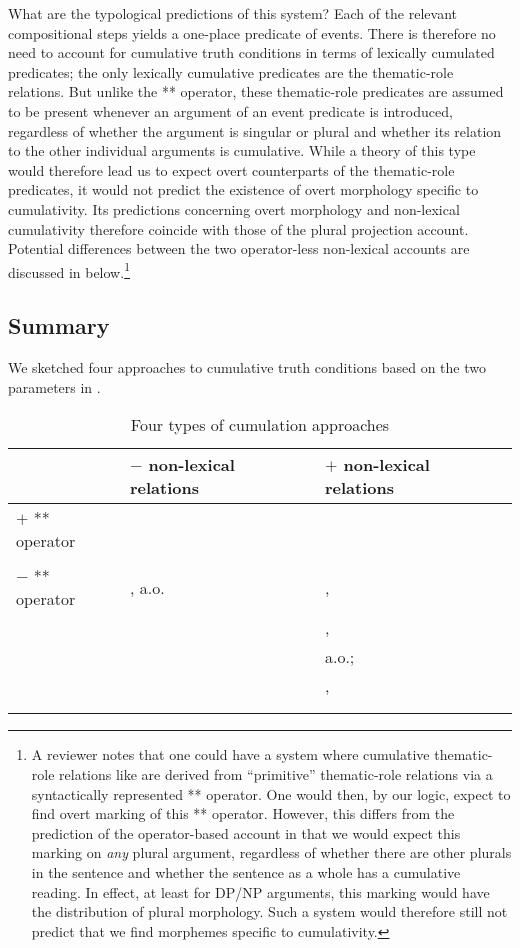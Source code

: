 \documentclass[output=paper]{langscibook}
\begin{document}
What are the typological predictions of this system? Each of the relevant compositional steps yields a one-place predicate of events. There is therefore no need to account for cumulative truth conditions in terms of lexically cumulated predicates; the only lexically cumulative predicates are the thematic-role relations. But unlike the ** operator, these thematic-role predicates are assumed to be present whenever an argument of an event predicate is introduced, regardless of whether the argument is singular or plural and whether its relation to the other individual arguments is cumulative. While a theory of this type would therefore lead us to expect overt counterparts of the thematic-role predicates, it would not predict the existence of overt morphology specific to cumulativity. Its predictions concerning overt morphology and non-lexical cumulativity therefore coincide with those of the plural projection account. Potential differences between the two operator-less non-lexical accounts are discussed in  below.\footnote{A reviewer notes that one could have a system where cumulative thematic-role relations like  are derived from ``primitive'' thematic-role relations via a syntactically represented ** operator. One would then, by our logic, expect to find overt marking of this ** operator. However, this differs from the prediction of the operator-based account in that we would expect this marking on \textit{any} plural argument, regardless of whether there are other plurals in the sentence and whether the sentence as a whole has a cumulative reading. In effect, at least for DP/NP arguments, this marking would have the distribution of plural morphology. Such a system would therefore still not predict that we find morphemes specific to cumulativity.}

\subsection{Summary}

We sketched four approaches to cumulative truth conditions based on the two parameters in .

\begin{table}
\caption{Four types of cumulation approaches}
\label{has-sch:table}
\centering
\begin{tabularx}{\textwidth}{lXX}  
  \lsptoprule
  & $-$ non-lexical relations & $+$ non-lexical relations \\  \midrule
 $+$ ** operator &  & \citet{Sternefeld:1998}\\ 
 & & \citet{Beck:2000a}\\\tablevspace
 $-$ ** operator & \citet{Scha:1981}, \citet{Krifka:1986} a.o. 
 & \citet{Landman:1996,Landman:2000}, \\
 & & \citet{Schein:1993},\\
 & & \citet{Kratzer:2003,Kratzer:2008} a.o.;\\
 & & \citet{Schmitt:2019}, \\
 & & \citet{Haslinger:2018a} \\
  \lspbottomrule
\end{tabularx}
\end{table}
\end{document}
